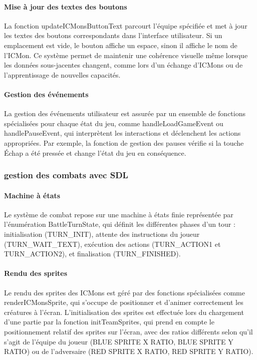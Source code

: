 \documentclass[12pt,a4paper, twoside]{article}
\begin{document}
\paragraph{Mise à jour des textes des boutons} La fonction updateICMonsButtonText parcourt l'équipe spécifiée et met à jour les textes des boutons correspondants dans l'interface utilisateur. Si un emplacement est vide, le bouton affiche un espace, sinon il affiche le nom de l'ICMon. Ce système permet de maintenir une cohérence visuelle même lorsque les données sous-jacentes changent, comme lors d'un échange d'ICMons ou de l'apprentissage de nouvelles capacités.

\paragraph{Gestion des événements} La gestion des événements utilisateur est assurée par un ensemble de fonctions spécialisées pour chaque état du jeu, comme handleLoadGameEvent ou handlePauseEvent, qui interprètent les interactions et déclenchent les actions appropriées. Par exemple, la fonction de gestion des pauses vérifie si la touche Échap a été pressée et change l'état du jeu en conséquence.

\subsubsection{gestion des combats avec SDL}
\paragraph{Machine à états} Le système de combat repose sur une machine à états finie représentée par l'énumération BattleTurnState, qui définit les différentes phases d'un tour : initialisation (TURN\_INIT), attente des instructions du joueur (TURN\_WAIT\_TEXT), exécution des actions (TURN\_ACTION1 et TURN\_ACTION2), et finalisation (TURN\_FINISHED).

\paragraph{Rendu des sprites} Le rendu des sprites des ICMons est géré par des fonctions spécialisées comme renderICMonsSprite, qui s'occupe de positionner et d'animer correctement les créatures à l'écran. L'initialisation des sprites est effectuée lors du chargement d'une partie par la fonction initTeamSprites, qui prend en compte le positionnement relatif des sprites sur l'écran, avec des ratios différents selon qu'il s'agit de l'équipe du joueur (BLUE SPRITE X RATIO, BLUE SPRITE Y RATIO) ou de l'adversaire (RED SPRITE X RATIO, RED SPRITE Y RATIO).
\end{document}
